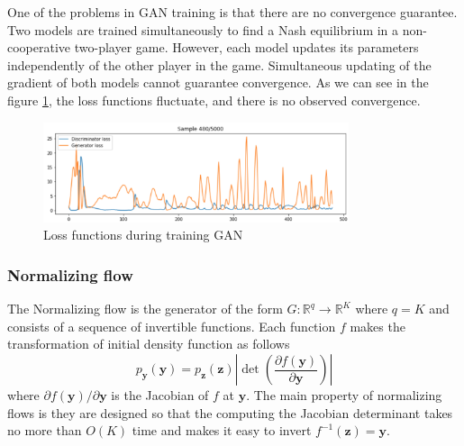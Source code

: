 \documentclass[12pt,a4paper]{article}
\begin{document}
One of the problems in GAN training is that there are no convergence guarantee. Two models are trained simultaneously to find a Nash equilibrium in a non-cooperative two-player game. However, each model updates its parameters independently of the other player in the game. Simultaneous updating of the gradient of both models cannot guarantee convergence. As we can see in the figure \ref{fig:gan}, the loss functions fluctuate, and there is no observed convergence.

\begin{figure}[!ht]
    \centering
    \includegraphics[width=0.8\textwidth]{gan.png}
    \caption{Loss functions during training GAN}
    \label{fig:gan}
\end{figure}

\subsubsection{Normalizing flow}

The Normalizing flow \cite{normflow2021} is the generator of the form $G: \mathbb R^q \to \mathbb R^K$ where $q=K$ and consists of a sequence of invertible functions. Each function $f$ makes the transformation of initial density function as follows
$$p_{\mathbf{y}}(\mathbf{y})=p_{\mathbf{z}}(\mathbf{z})\left|\operatorname{det}\left(\frac{\partial f(\mathbf{y})}{\partial \mathbf{y}}\right)\right|$$
where $\partial f(\mathbf y)/\partial \mathbf y$ is the Jacobian of $f$ at $\mathbf y$. The main property of normalizing flows is they are designed so that the computing the Jacobian determinant takes no more than  $O(K)$ time and makes it easy to invert $f^{-1}(\mathbf z) = \mathbf y$.
\end{document}
